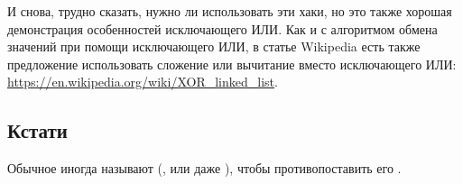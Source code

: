 И снова, трудно сказать, нужно ли использовать эти хаки, но это также хорошая демонстрация особенностей исключающего ИЛИ.
Как и с алгоритмом обмена значений при помощи исключающего ИЛИ, в статье Wikipedia есть также предложение использовать
сложение или вычитание вместо исключающего ИЛИ:
\url{https://en.wikipedia.org/wiki/XOR_linked_list}.

\subsection{Кстати}

Обычное  иногда называют  (, или даже ),
чтобы противопоставить его .

